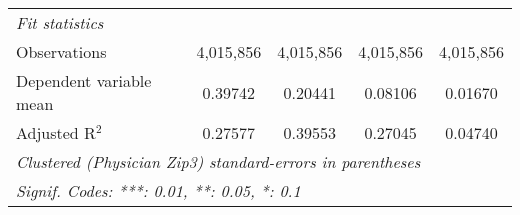 \begin{table}[htbp]
\begin{threeparttable}[b]
\begin{tabular}{lcccc}
         \emph{Fit statistics}\\
         Observations            & 4,015,856      & 4,015,856      & 4,015,856      & 4,015,856\\  
         Dependent variable mean & 0.39742        & 0.20441        & 0.08106        & 0.01670\\  
         Adjusted R$^2$          & 0.27577        & 0.39553        & 0.27045        & 0.04740\\  
         \midrule \midrule
         \multicolumn{5}{l}{\emph{Clustered (Physician Zip3) standard-errors in parentheses}}\\
         \multicolumn{5}{l}{\emph{Signif. Codes: ***: 0.01, **: 0.05, *: 0.1}}\\
      \end{tabular}
   \end{threeparttable}
\end{table}


